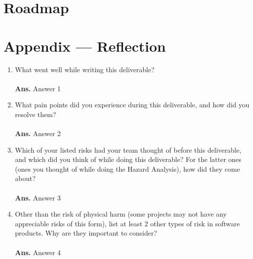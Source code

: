 \documentclass{article}
\begin{document}
\section{Roadmap}


\newpage{}

\section*{Appendix --- Reflection}




\begin{enumerate}
    \item What went well while writing this deliverable? \\ \\
    \hspace*{-0.97cm}\textbf{Ans.} Answer 1 \\
    
    \item What pain points did you experience during this deliverable, and how did you resolve them? \\ \\
    \hspace*{-0.97cm}\textbf{Ans.} Answer 2 \\
    
    \item Which of your listed risks had your team thought of before this
    deliverable, and which did you think of while doing this deliverable? For
    the latter ones (ones you thought of while doing the Hazard Analysis), how did they come about? \\ \\
    \hspace*{-0.97cm}\textbf{Ans.} Answer 3 \\
    
    \item Other than the risk of physical harm (some projects may not have any appreciable risks of this form), list at least 2 other types of risk in software products. Why are they important to consider? \\ \\
    \hspace*{-0.97cm}\textbf{Ans.} Answer 4 \\
    
\end{enumerate}
\end{document}
